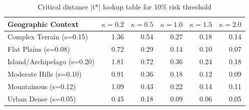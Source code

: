 \begin{table}[t]
\caption{Critical distance |t*| lookup table for 10\% risk threshold}
\label{tab:safety_bands_lookup}
\centering
\begin{tabular}{lrrrrr}
\toprule
Geographic Context & $\kappa=0.2$ & $\kappa=0.5$ & $\kappa=1.0$ & $\kappa=1.5$ & $\kappa=2.0$ \\
\midrule
Complex Terrain (s=0.15) & 1.36 & 0.54 & 0.27 & 0.18 & 0.14 \\
Flat Plains (s=0.08) & 0.72 & 0.29 & 0.14 & 0.10 & 0.07 \\
Island/Archipelago (s=0.20) & 1.81 & 0.72 & 0.36 & 0.24 & 0.18 \\
Moderate Hills (s=0.10) & 0.91 & 0.36 & 0.18 & 0.12 & 0.09 \\
Mountainous (s=0.12) & 1.09 & 0.43 & 0.22 & 0.14 & 0.11 \\
Urban Dense (s=0.05) & 0.45 & 0.18 & 0.09 & 0.06 & 0.05 \\
\bottomrule
\end{tabular}
\end{table}
